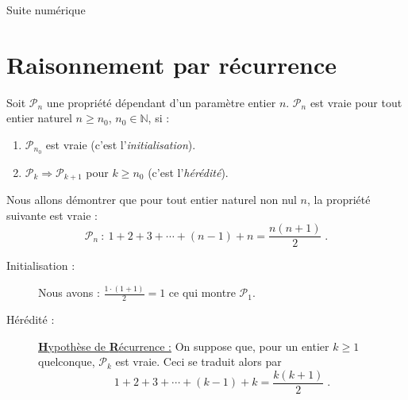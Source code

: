 
\TCDLessonStyleOn
\begin{chapter}{Suite num\'erique}
%
\section{Raisonnement par r\'ecurrence}
%
      \begin{prop}
            Soit $\mathcal{P}_n$ une propri\'et\'e d\'ependant d'un param\`etre entier $n$.
            $\mathcal{P}_n$ est vraie pour tout entier naturel $n \geq n_0$, $n_0 \in \mathbb{N}$, si : 
                  \begin{enumerate}
                        \item $\mathcal{P}_{n_0}$ est vraie (c'est l'\emph{initialisation}).
                        \item $\mathcal{P}_k \Rightarrow \mathcal{P}_{k+1}$ pour $k\geq n_0$ (c'est l'\emph{h\'er\'edit\'e}).
                  \end{enumerate}
      \end{prop}
      \begin{ex}
            Nous allons d\'emontrer que pour tout entier naturel non nul $n$,
            la propri\'et\'e suivante est vraie : 
                  $$
                        \mathcal{P}_n \ : \ 
                        1 + 2 + 3 + \cdots + (n-1) + n = \frac{n (n+1)}{2}
                        \;.
                  $$
            \begin{description}
                  \item[Initialisation :]
                        Nous avons :
                              $
                                    \frac{1 \cdot (1+1)}{2} = 1 
                              $
                        ce qui montre $\mathcal{P}_1$.
                  \item[H\'er\'edit\'e :]
                        \underline{\textbf{H}ypoth\`ese de \textbf{R}\'ecurrence :}
                        On suppose que, pour un entier $k \geq 1$ quelconque, $\mathcal{P}_k$ est vraie.
                        Ceci se traduit alors par 
                              \[
                              1+2+3+\cdots+(k-1)+k = \frac{k(k+1)}{2}\;.
\]
\end{description}
\end{ex}
\end{chapter}
